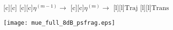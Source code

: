 \documentclass{article}
\begin{document}
\begin{figure}[htb]
  \begin{center}

        [c][c]{}
        [c][c]{$\eta^{(m-1)} \rightarrow$}
        [c][c]{$\eta^{(m)} \rightarrow$}
        [l][l]{$\mathrm{Traj}$}
        [l][l]{$\mathrm{Trans}$}
	

    \texttt{[image: mue\_full\_8dB\_psfrag.eps]}
    \end{center}
\end{figure}
\end{document}
